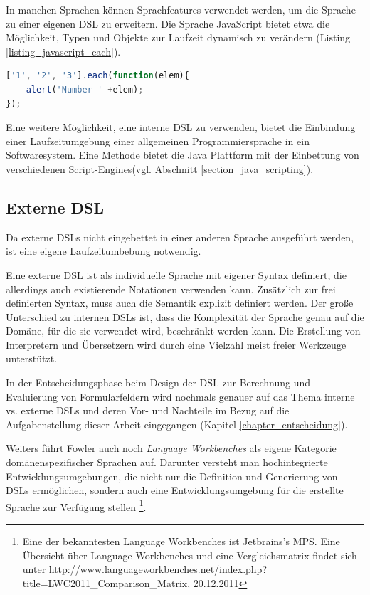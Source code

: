 In manchen Sprachen können Sprachfeatures verwendet werden, um die Sprache zu einer eigenen DSL zu erweitern. Die Sprache JavaScript bietet etwa die Möglichkeit, Typen und Objekte zur Laufzeit dynamisch zu verändern (Listing \ref{listing_javascript_each}).\\

\begin{lstlisting}[language=JavaScript, caption={Erweiterung des Array-Typs um die Funktion \texttt{each()} in der JavaScript Bibliothek Prototype},label=listing_javascript_each]
['1', '2', '3'].each(function(elem){
	alert('Number ' +elem);
});
\end{lstlisting}

Eine weitere Möglichkeit, eine interne DSL zu verwenden, bietet die Einbindung einer Laufzeitumgebung einer allgemeinen Programmiersprache in ein Softwaresystem. Eine Methode bietet die Java Plattform mit der Einbettung von verschiedenen Script-Engines(vgl. Abschnitt \ref{section_java_scripting}).

\subsection{Externe DSL} 

Da externe DSLs nicht eingebettet in einer anderen Sprache ausgeführt werden, ist eine eigene Laufzeitumbebung notwendig. 

Eine externe DSL ist als individuelle Sprache mit eigener Syntax definiert, die allerdings auch existierende Notationen verwenden kann. Zusätzlich zur frei definierten Syntax, muss auch die Semantik explizit definiert werden. Der große Unterschied zu internen DSLs ist, dass die Komplexität der Sprache genau auf die Domäne, für die sie verwendet wird, beschränkt werden kann. Die Erstellung von Interpretern und Übersetzern wird durch eine Vielzahl meist freier Werkzeuge unterstützt.

In der Entscheidungsphase beim Design der DSL zur Berechnung und Evaluierung von Formularfeldern wird nochmals genauer 
auf das Thema interne vs. externe DSLs und deren Vor- und Nachteile im Bezug auf die Aufgabenstellung dieser 
Arbeit eingegangen (Kapitel \ref{chapter_entscheidung}).

Weiters führt Fowler auch noch \textit{Language Workbenches} als eigene Kategorie domänenspezifischer Sprachen auf. 
Darunter versteht man hochintegrierte Entwicklungsumgebungen, die nicht nur die Definition und Generierung von DSLs ermöglichen, 
sondern auch eine Entwicklungsumgebung für die erstellte Sprache zur Verfügung stellen
\footnote{Eine der bekanntesten Language Workbenches ist Jetbrains's MPS. Eine Übersicht über Language Workbenches und eine 
Vergleichsmatrix findet sich unter http://www.languageworkbenches.net/index.php?title=LWC2011\_Comparison\_Matrix, 20.12.2011}.



